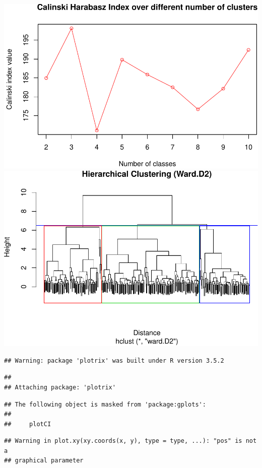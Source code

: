 \documentclass[]{article}
\begin{document}
\includegraphics{project_report_files/figure-latex/unnamed-chunk-27-1.pdf}
\includegraphics{project_report_files/figure-latex/unnamed-chunk-27-2.pdf}

\begin{verbatim}
## Warning: package 'plotrix' was built under R version 3.5.2
\end{verbatim}

\begin{verbatim}
## 
## Attaching package: 'plotrix'
\end{verbatim}

\begin{verbatim}
## The following object is masked from 'package:gplots':
## 
##     plotCI
\end{verbatim}

\begin{verbatim}
## Warning in plot.xy(xy.coords(x, y), type = type, ...): "pos" is not a
## graphical parameter
\end{verbatim}
\end{document}
